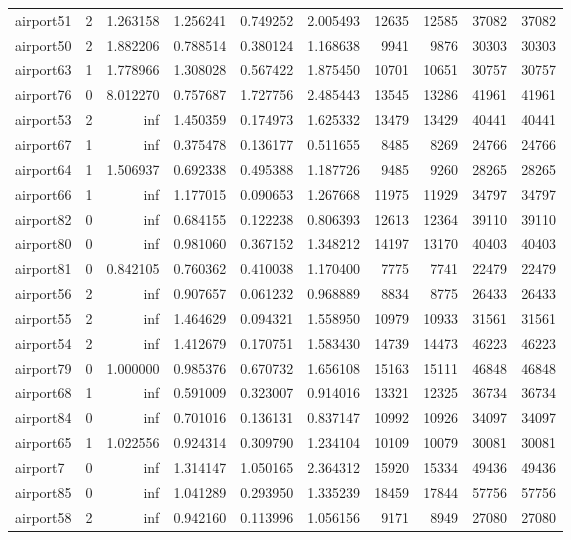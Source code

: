 \begin{longtable}{|l|r|r|r|r|r|r|r|r|r|}
airport51 & 2 & 1.263158 & 1.256241 & 0.749252 & 2.005493 & 12635 & 12585 & 37082 & 37082 \\
airport50 & 2 & 1.882206 & 0.788514 & 0.380124 & 1.168638 & 9941 & 9876 & 30303 & 30303 \\
airport63 & 1 & 1.778966 & 1.308028 & 0.567422 & 1.875450 & 10701 & 10651 & 30757 & 30757 \\
airport76 & 0 & 8.012270 & 0.757687 & 1.727756 & 2.485443 & 13545 & 13286 & 41961 & 41961 \\
airport53 & 2 & inf & 1.450359 & 0.174973 & 1.625332 & 13479 & 13429 & 40441 & 40441 \\
airport67 & 1 & inf & 0.375478 & 0.136177 & 0.511655 & 8485 & 8269 & 24766 & 24766 \\
airport64 & 1 & 1.506937 & 0.692338 & 0.495388 & 1.187726 & 9485 & 9260 & 28265 & 28265 \\
airport66 & 1 & inf & 1.177015 & 0.090653 & 1.267668 & 11975 & 11929 & 34797 & 34797 \\
airport82 & 0 & inf & 0.684155 & 0.122238 & 0.806393 & 12613 & 12364 & 39110 & 39110 \\
airport80 & 0 & inf & 0.981060 & 0.367152 & 1.348212 & 14197 & 13170 & 40403 & 40403 \\
airport81 & 0 & 0.842105 & 0.760362 & 0.410038 & 1.170400 & 7775 & 7741 & 22479 & 22479 \\
airport56 & 2 & inf & 0.907657 & 0.061232 & 0.968889 & 8834 & 8775 & 26433 & 26433 \\
airport55 & 2 & inf & 1.464629 & 0.094321 & 1.558950 & 10979 & 10933 & 31561 & 31561 \\
airport54 & 2 & inf & 1.412679 & 0.170751 & 1.583430 & 14739 & 14473 & 46223 & 46223 \\
airport79 & 0 & 1.000000 & 0.985376 & 0.670732 & 1.656108 & 15163 & 15111 & 46848 & 46848 \\
airport68 & 1 & inf & 0.591009 & 0.323007 & 0.914016 & 13321 & 12325 & 36734 & 36734 \\
airport84 & 0 & inf & 0.701016 & 0.136131 & 0.837147 & 10992 & 10926 & 34097 & 34097 \\
airport65 & 1 & 1.022556 & 0.924314 & 0.309790 & 1.234104 & 10109 & 10079 & 30081 & 30081 \\
airport7 & 0 & inf & 1.314147 & 1.050165 & 2.364312 & 15920 & 15334 & 49436 & 49436 \\
airport85 & 0 & inf & 1.041289 & 0.293950 & 1.335239 & 18459 & 17844 & 57756 & 57756 \\
airport58 & 2 & inf & 0.942160 & 0.113996 & 1.056156 & 9171 & 8949 & 27080 & 27080 \\

\end{longtable}

